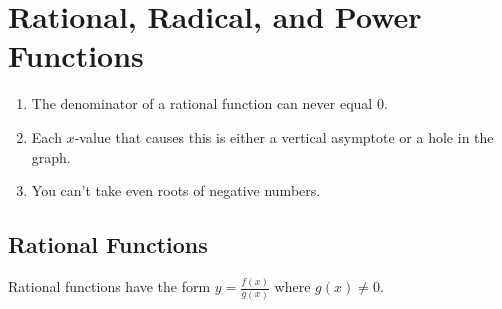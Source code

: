 \documentclass{article}
\begin{document}
\section*{Rational, Radical, and Power Functions}

\begin{tcolorbox}[colframe=orange!70!white, coltitle=black, title=\textbf{Summary}]
\begin{enumerate}
    \item The denominator of a rational function can never equal 0.
    \item Each $x$-value that causes this is either a vertical asymptote or a hole in the graph.
    \item You can't take even roots of negative numbers.
\end{enumerate}
\end{tcolorbox}
\vspace{1in}

\subsection*{Rational Functions}

Rational functions have the form $y = \frac{f(x)}{g(x)}$ where $g(x) \neq 0$.
\vspace{0.5in}
\end{document}
